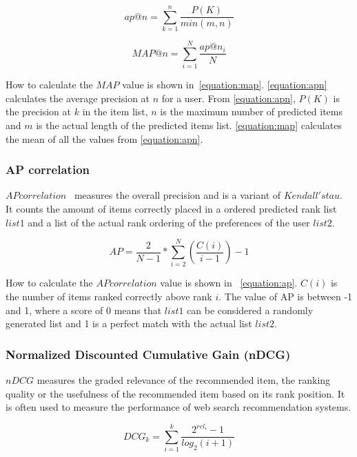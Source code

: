 \begin{equation}
	ap@n = \sum_{k=1}^{n}{\frac{P(K)}{min(m,n)}}
	\label{equation:apn}
\end{equation}

\begin{equation}
	MAP@n = \sum_{i=1}^{N}{\frac{ap@n_i}{N}}
	\label{equation:map}
\end{equation}

How to calculate the $MAP$ value is shown in~\ref{equation:map}.
\ref{equation:apn} calculates the average precision at $n$ for a user.
From \ref{equation:apn}, $P(K)$ is the precision at $k$ in the item list, $n$ is the maximum number of predicted items and $m$ is the actual length of the predicted items list.
\ref{equation:map} calculates the mean of all the values from \ref{equation:apn}.


\subsubsection{AP correlation}
$AP correlation$~\cite{Yilmaz:2008:NRC:1390334.1390435} measures the overall precision and is a variant of $Kendall's tau$.
It counts the amount of items correctly placed in a ordered predicted rank list $list1$ and a list of the actual rank ordering of the preferences of the user $list2$.

\begin{equation}
	AP = \frac{2}{N - 1} * \sum_{i=2}^{N}{(\frac{C(i)}{i - 1})} - 1
	\label{equation:ap}
\end{equation}

How to calculate the $AP correlation$ value is shown in ~\ref{equation:ap}.
$C(i)$ is the number of items ranked correctly above rank $i$.
The value of AP is between -1 and 1, where a score of 0 means that $list1$ can be considered a randomly generated list and 1 is a perfect match with the actual list $list2$.


\subsubsection{Normalized Discounted Cumulative Gain (nDCG)}
$nDCG$ measures the graded relevance of the recommended item, the ranking quality or the usefulness of the recommended item based on its rank position.
It is often used to measure the performance of web search recommendation systems.

\begin{equation}
	DCG_k = \sum_{i=1}^{k}{\frac{2^{rel_i}-1}{log_2(i+1)}}
	\label{equation:dcg}
\end{equation}

